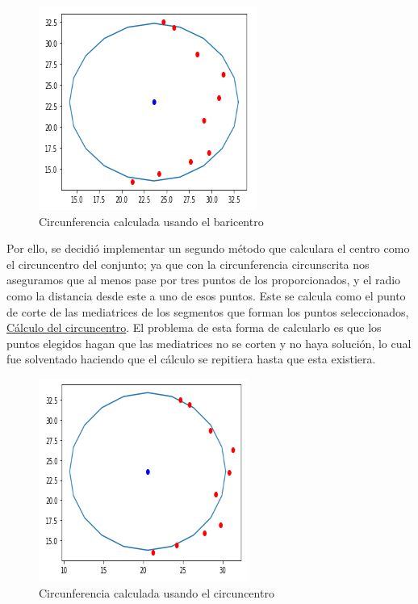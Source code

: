 \documentclass[conference,a4paper]{IEEEtran}
\begin{document}
\begin{figure}[H]
\centering
\includegraphics[scale=0.8]{ArcoBaricentroResultado}
\caption{Circunferencia calculada usando el baricentro}
\end{figure}

Por ello, se decidió implementar un segundo método que calculara el centro como el circuncentro del conjunto; ya que con la circunferencia circunscrita nos aseguramos que al menos pase por tres puntos de los proporcionados, y el radio como la distancia desde este a uno de esos puntos. Este se calcula como el punto de corte de las mediatrices de los segmentos que forman los puntos seleccionados, \hyperref[bib:georgeSeif]{Cálculo del circuncentro}. El problema de esta forma de calcularlo es que los puntos elegidos hagan que las mediatrices no se corten y no haya solución, lo cual fue solventado haciendo que el cálculo se repitiera hasta que esta existiera.

\begin{figure}[H]
\centering
\includegraphics[scale=0.8]{ArcoCircuncentroResultado}
\caption{Circunferencia calculada usando el circuncentro}
\end{figure}
\end{document}
